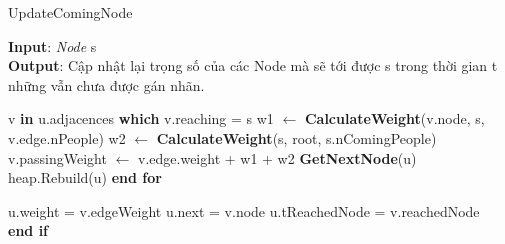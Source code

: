     \begin{algorithm}
        \caption{UpdateComingNode}
        \textbf{Input}: \textit{Node} s \\ 
        \textbf{Output}: Cập nhật lại trọng số của các Node mà sẽ tới được s
        trong thời gian t những vẫn chưa được gán nhãn.
        \begin{algorithmic}
            \State v \textbf{in} u.adjacences \textbf{which} v.reaching = s
            \State w1 $\gets$ \textbf{CalculateWeight}(v.node, s, v.edge.nPeople)
            \State w2 $\gets$ \textbf{CalculateWeight}(s, root, s.nComingPeople)
            \State v.passingWeight $\gets$ v.edge.weight + w1 + w2
            \State \textbf{GetNextNode}(u)
            \State heap.Rebuild(u)
            \EndFor
            \textbf{end for}
            \EndProcedure

            \State u.weight = v.edgeWeight
            \State u.next = v.node
            \State u.tReachedNode = v.reachedNode \\
            \EndIf
            \textbf{end if}
            \EndFor
            \EndProcedure
        \end{algorithmic}
    \end{algorithm}